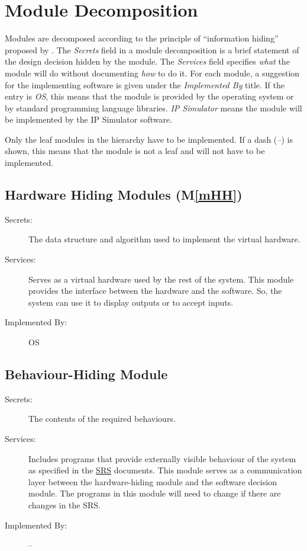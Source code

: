 \documentclass[12pt, titlepage]{article}
\newcommand{\mref}[1]{M\ref{#1}}
\begin{document}
\section{Module Decomposition} \label{SecMD}

Modules are decomposed according to the principle of ``information hiding''
proposed by \citet{ParnasEtAl1984}. The \emph{Secrets} field in a module
decomposition is a brief statement of the design decision hidden by the
module. The \emph{Services} field specifies \emph{what} the module will do
without documenting \emph{how} to do it. For each module, a suggestion for the implementing software is given under the \emph{Implemented By} title. If the entry is \emph{OS}, this means that the module is provided by the operating system or by standard programming language libraries.  \emph{IP Simulator} means the module will be implemented by the IP Simulator software.

Only the leaf modules in the hierarchy have to be implemented. If a dash
(\emph{--}) is shown, this means that the module is not a leaf and will not have to be implemented.

\subsection{Hardware Hiding Modules (\mref{mHH})}

\begin{description}
\item[Secrets:]The data structure and algorithm used to implement the virtual hardware.
\item[Services:]Serves as a virtual hardware used by the rest of the
  system. This module provides the interface between the hardware and the
  software. So, the system can use it to display outputs or to accept inputs.
\item[Implemented By:] OS
\end{description}

\subsection{Behaviour-Hiding Module}

\begin{description}
\item[Secrets:] The contents of the required behaviours.
\item[Services:] Includes programs that provide externally visible behaviour of
  the system as specified in the \href{https://github.com/MinMah23/CAS741-Project/tree/main/docs/SRS}{SRS}
  documents. This module serves as a communication layer between the
  hardware-hiding module and the software decision module. The programs in this
  module will need to change if there are changes in the SRS.
\item[Implemented By:] --
\end{description}
\end{document}
